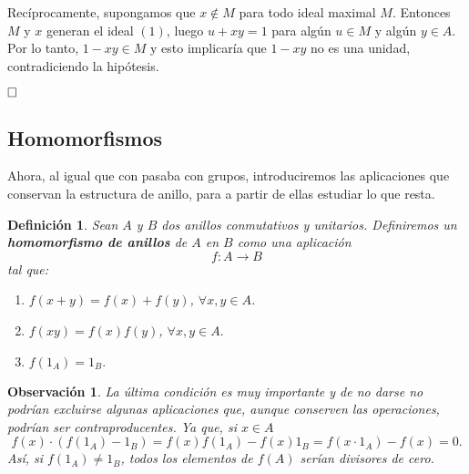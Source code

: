 \documentclass[12pt]{article}
\newtheorem{definition}[theorem]{Definición}
\newtheorem{observation}{Observación}[theorem]
\begin{document}
Recíprocamente, supongamos que $x \notin M$ para todo ideal maximal $M$. Entonces $M$ y $x$ generan el ideal $(1)$, luego $u +xy = 1$ para algún $u \in M$ y algún $y \in A$. Por lo tanto, $1-xy \in M$ y esto implicaría que $1-xy$ no es una unidad, contradiciendo la hipótesis.

$\hfill \square$

\subsection{Homomorfismos}

Ahora, al igual que con pasaba con grupos, introduciremos las aplicaciones que conservan la estructura de anillo, para a partir de ellas estudiar lo que resta.

\begin{definition} Sean $A$ y $B$ dos anillos conmutativos y unitarios. Definiremos un \textbf{homomorfismo de anillos} de $A$ en $B$ como una aplicación $$f \colon A \longrightarrow B$$ tal que: \begin{enumerate}
\item $f(x + y) = f(x) + f(y)$, $\forall x,y \in A$.
\item $f(xy) = f(x)f(y)$, $\forall x,y \in A.$
\item $f(1_{A}) = 1_{B}.$
\end{enumerate}

\end{definition}
\begin{observation} La última condición es muy importante y de no darse no podrían excluirse algunas aplicaciones que, aunque conserven las operaciones, podrían ser contraproducentes. Ya que, si $x \in A$ $$f(x) \cdot (f(1_{A}) - 1_{B}) = f(x) f(1_{A}) - f(x)1_{B} = f(x \cdot 1_{A}) - f(x) = 0.$$ Así, si $f(1_{A}) \neq 1_{B}$, todos los elementos de $f(A)$ serían divisores de cero. 
\end{observation}
\end{document}
